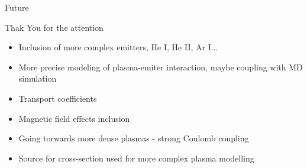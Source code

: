 \documentclass{beamer}
\begin{document}
\begin{frame}{Future}
\begin{center}
{\Huge Thak You for the attention}  
\end{center}

\begin{itemize}
  \item Inclusion of more complex emitters, He I, He II, Ar I...
  \item More precise modeling of plasma-emiter interaction, maybe coupling with MD simulation
  \item Transport coefficients
  \item Magnetic field effects inclusion
  \item Going torwards more dense plasmas - strong Coulomb coupling
  \item Source for cross-section used for more complex plasma modelling
 \end{itemize}

\end{frame}
\end{document}
